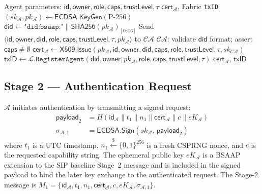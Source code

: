 \documentclass[review,5p,twocolumn,times]{elsarticle}
\begin{document}
\begin{algorithm}[H]
\caption{Agent Registration (Stage 1)}
\label{alg:reg}
\begin{algorithmic}[1]
\Require Agent parameters: $\mathsf{id}, \mathsf{owner}, \mathsf{role}, \mathsf{caps}, \mathsf{trustLevel}, \tau$
\Ensure $\mathsf{cert}_\mathcal{A}$, Fabric \texttt{txID}
\State $(sk_\mathcal{A}, pk_\mathcal{A}) \leftarrow \mathsf{ECDSA.KeyGen}(\text{P-256})$
\State $\mathsf{did} \leftarrow \texttt{"did:bsaap:"} \| \mathsf{SHA256}(pk_\mathcal{A})_{[0:16]}$
\State Send $\langle \mathsf{id}, \mathsf{owner}, \mathsf{did}, \mathsf{role}, \mathsf{caps},
       \mathsf{trustLevel}, \tau, pk_\mathcal{A} \rangle$ to $\mathcal{CA}$
\State $\mathcal{CA}$: validate $\mathsf{did}$ format; assert $\mathsf{caps} \neq \emptyset$
\State $\mathsf{cert}_\mathcal{A} \leftarrow
       \mathsf{X509.Issue}(pk_\mathcal{A}, \mathsf{id}, \mathsf{owner},
       \mathsf{did}, \mathsf{caps}, \mathsf{role}, \mathsf{trustLevel},
       \tau, sk_{\mathcal{CA}})$
\State $\mathsf{txID} \leftarrow
       \mathcal{L}.\mathtt{RegisterAgent}(\mathsf{did}, \mathsf{owner},
       pk_\mathcal{A}, \mathsf{role}, \mathsf{caps}, \mathsf{trustLevel}, \tau)$
\State \Return $\mathsf{cert}_\mathcal{A}$, $\mathsf{txID}$
\end{algorithmic}
\end{algorithm}

\subsection{Stage 2 --- Authentication Request}

$\mathcal{A}$ initiates authentication by transmitting a signed request:
\begin{align}
\mathsf{payload}_2 &= H\!\left(\mathsf{id}_\mathcal{A} \| t_1 \|
                   n_1 \| \mathsf{cert}_\mathcal{A} \| c \|
                   eK_\mathcal{A} \right)
\label{eq:payload2}\\
\sigma_{\mathcal{A},1} &= \mathsf{ECDSA.Sign}(sk_\mathcal{A},\,
                   \mathsf{payload}_2)
\label{eq:sig2}
\end{align}
where $t_1$ is a UTC timestamp, $n_1 \xleftarrow{\$} \{0,1\}^{256}$ is a
fresh CSPRNG nonce, and $c$ is the requested capability string. The ephemeral
public key $eK_\mathcal{A}$ is a BSAAP extension to the SIP baseline Stage~2
message and is included in the signed payload to bind the later key exchange
to the authenticated request.
The Stage-2 message is
$M_1 = \{\mathsf{id}_\mathcal{A}, t_1, n_1, \mathsf{cert}_\mathcal{A},
c, eK_\mathcal{A}, \sigma_{\mathcal{A},1}\}$.
\end{document}
